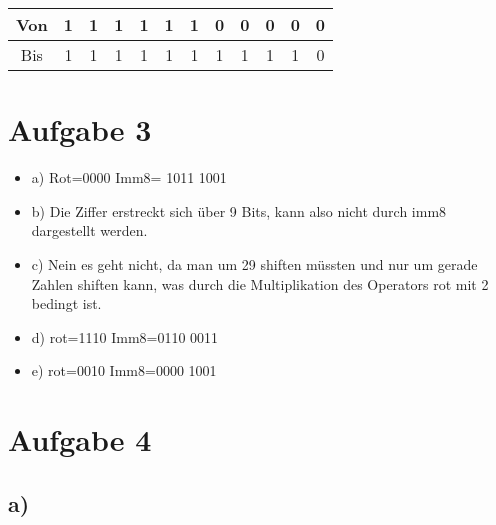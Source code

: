 \documentclass{article}
\begin{document}
	\begin{tabular}{|c|ccc|ccc|ccccc|} \hline
	Von&1&1&1&1&1&1&0&0&0&0&0\\ \hline
	Bis&1&1&1&1&1&1&1&1&1&1&0\\ \hline
	\end{tabular}


\section*{Aufgabe 3}

		\begin{itemize}

	\item a) Rot=0000 Imm8= 1011 1001
	\item b) Die Ziffer erstreckt sich über 9 Bits, kann also nicht durch imm8 dargestellt werden. 
	\item c) Nein es geht nicht, da man um 29 shiften müssten und nur um gerade Zahlen shiften kann, was durch die Multiplikation des Operators rot mit 2 bedingt ist. 
	\item d) rot=1110 Imm8=0110 0011
	\item e) rot=0010 Imm8=0000 1001

	\end{itemize}



\section*{Aufgabe 4}

	\subsection*{a)}
\end{document}

